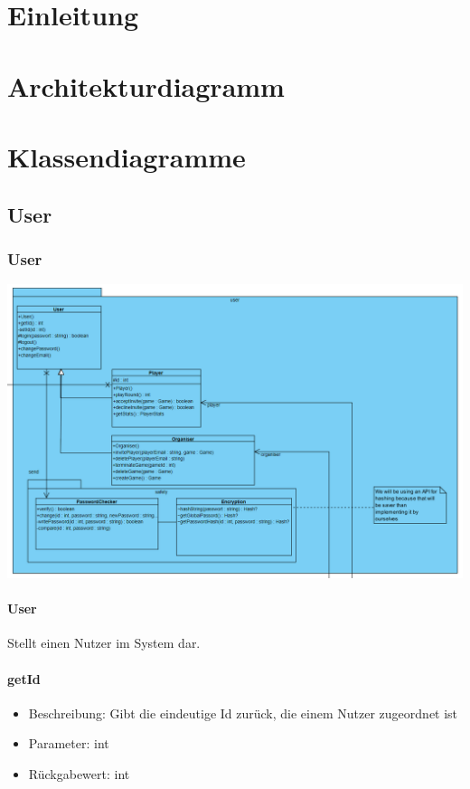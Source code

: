 \documentclass[a4paper]{scrreprt}
\begin{document}
	
	\tableofcontents
	\chapter{Einleitung}
	\chapter{Architekturdiagramm}
	
	\chapter{Klassendiagramme}
	
	\section{User}
	\subsection{User}
	\includegraphics[width=\textwidth]{img/user.png}
	\subsubsection{User}
	Stellt einen Nutzer im System dar.
	\subsubsection{getId}
	\begin{itemize}
		\item Beschreibung: Gibt die eindeutige Id zurück, die einem Nutzer zugeordnet ist
		\item Parameter: int
		\item Rückgabewert: int
	\end{itemize}
\end{document}
